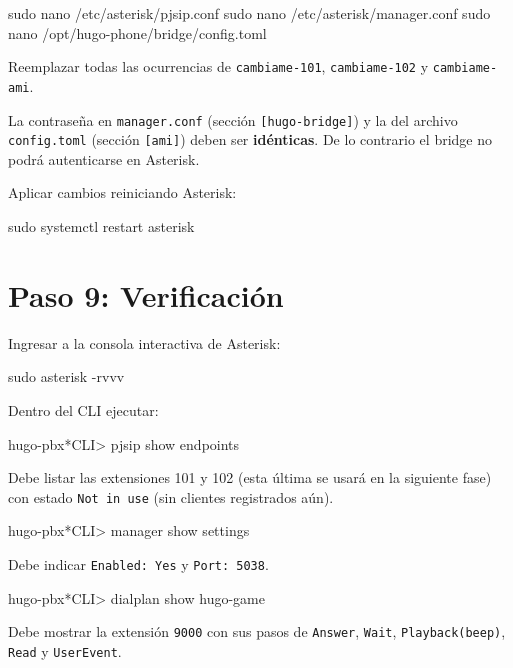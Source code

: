 \begin{shellcode}
sudo nano /etc/asterisk/pjsip.conf
sudo nano /etc/asterisk/manager.conf
sudo nano /opt/hugo-phone/bridge/config.toml
\end{shellcode}

Reemplazar todas las ocurrencias de \texttt{cambiame-101}, \texttt{cambiame-102} y \texttt{cambiame-ami}.

\begin{advertencia}
La contraseña en \texttt{manager.conf} (sección \texttt{[hugo-bridge]}) y la del archivo \texttt{config.toml} (sección \texttt{[ami]}) deben ser \textbf{idénticas}. De lo contrario el bridge no podrá autenticarse en Asterisk.
\end{advertencia}

Aplicar cambios reiniciando Asterisk:

\begin{shellcode}
sudo systemctl restart asterisk
\end{shellcode}

\section{Paso 9: Verificación}

Ingresar a la consola interactiva de Asterisk:

\begin{shellcode}
sudo asterisk -rvvv
\end{shellcode}

Dentro del CLI ejecutar:

\begin{plaincode}
hugo-pbx*CLI> pjsip show endpoints
\end{plaincode}

Debe listar las extensiones 101 y 102 (esta última se usará en la siguiente fase) con estado \texttt{Not in use} (sin clientes registrados aún).

\begin{plaincode}
hugo-pbx*CLI> manager show settings
\end{plaincode}

Debe indicar \texttt{Enabled: Yes} y \texttt{Port: 5038}.

\begin{plaincode}
hugo-pbx*CLI> dialplan show hugo-game
\end{plaincode}

Debe mostrar la extensión \texttt{9000} con sus pasos de \texttt{Answer}, \texttt{Wait}, \texttt{Playback(beep)}, \texttt{Read} y \texttt{UserEvent}.

